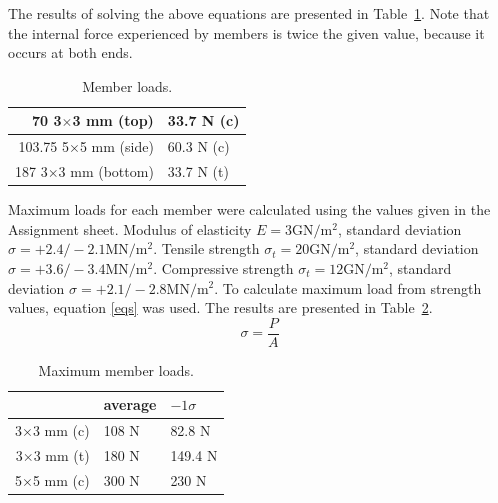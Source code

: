\documentclass[12pt]{article}
\begin{document}
		The results of solving the above equations are presented in Table~\ref{loads}. Note that the internal force experienced by members is twice the given value, because it occurs at both ends.
		\begin{table}[h!]
			\caption{Member loads.}
			\begin{center}
			\begin{tabular}{ | r | l | }
				\hline
				70 3$\times$3 mm (top) & 33.7 N (c) \\ \hline
				103.75 5$\times$5 mm (side) & 60.3 N (c) \\ \hline
				187 3$\times$3 mm (bottom) & 33.7 N (t) \\ \hline
			\end{tabular}
			\end{center}
			\label{loads}
		\end{table}

		Maximum loads for each member were calculated using the values given in the Assignment sheet. Modulus of elasticity $E=3\mathrm{GN}/\mathrm{m}^2$, standard deviation $\sigma=+2.4/-2.1\mathrm{MN}/\mathrm{m}^2$. Tensile strength $\sigma_t=20\mathrm{GN}/\mathrm{m}^2$,  standard deviation $\sigma=+3.6/-3.4\mathrm{MN}/\mathrm{m}^2$. Compressive strength $\sigma_t=12\mathrm{GN}/\mathrm{m}^2$,  standard deviation $\sigma=+2.1/-2.8\mathrm{MN}/\mathrm{m}^2$. To calculate maximum load from strength values, equation \ref{eqs} was used. The results are presented in Table~\ref{maxloads}.
		\begin{equation}
			\sigma=\frac{P}{A}
			\label{eqs}
		\end{equation}
		\begin{table}[h!]
			\caption{Maximum member loads.}
			\begin{center}
			\begin{tabular}{ | r | l | l | }
				\hline
				& average & $-1\sigma$ \\ \hline
				3$\times$3 mm (c) & 108 N & 82.8 N \\ \hline
				3$\times$3 mm (t) & 180 N & 149.4 N \\ \hline
				5$\times$5 mm (c) & 300 N & 230 N \\ \hline
			\end{tabular}
			\end{center}
			\label{maxloads}
		\end{table}
\end{document}
